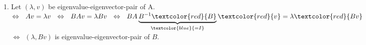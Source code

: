 {\begin{enumerate}
\begin{enumerate}
\begin{align*}
	&=A~~(\checkmark)
	\end{align*}
\end{enumerate}
\item Let $(\lambda,v)$ be eigenvalue-eigenvector-pair of A.\\
$\Leftrightarrow ~~Av=\lambda v~~\Leftrightarrow~~BAv=\lambda Bv~~\Leftrightarrow~~BA\underbrace{B^{-1}\textcolor{red}{B}}_{\textcolor{blue}{=I}}\textcolor{red}{v}=\lambda\textcolor{red}{Bv}$\\
$\Leftrightarrow~~(\lambda,Bv)$ is eigenvalue-eigenvector-pair of $B$.
\end{enumerate}
}
